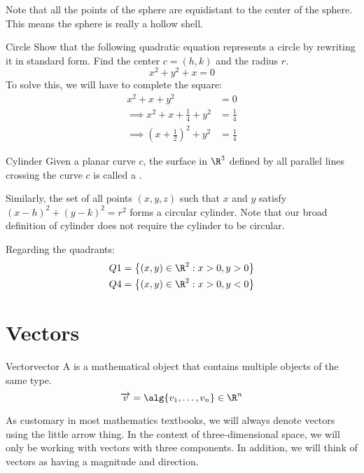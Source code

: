 \documentclass[12pt]{report}
\begin{document}
Note that all the points of the sphere are equidistant to the center of the sphere. This means the sphere is really a hollow shell.

\begin{exbox}{Circle}{}
    Show that the following quadratic equation represents a circle by rewriting it in standard form. Find the center $c = (h,k)$ and the radius $r$.
    \[ x^2 + y^2 + x = 0 \]
    \tcblower
    To solve this, we will have to complete the square:
    \begin{align*}
        x^2 + x + y^2 &= 0 \\
        \implies x^2 + x + \frac{1}{4} + y^2 &= \frac{1}{4} \\
        \implies \left( x + \frac12 \right)^2 + y^2 &= \frac14
    \end{align*}
\end{exbox}

\begin{dfnbox}{Cylinder}{}
    Given a planar curve $c$, the surface in $\R^3$ defined by all parallel lines crossing the curve $c$ is called a .
\end{dfnbox}

Similarly, the set of all points $(x,y,z)$ such that $x$ and $y$ satisfy $(x-h)^2 + (y-k)^2 = r^2$ forms a circular cylinder. Note that our broad definition of cylinder does not require the cylinder to be circular.

Regarding the quadrants:
\begin{align*}
    Q1 &= \left\{ (x,y) \in \R^2 : x > 0, y > 0 \right\} \\
    Q4 &= \left\{ (x,y) \in \R^2 : x > 0, y < 0 \right\}
\end{align*}


\section{Vectors}

\begin{dfnbox}{Vector}{vector}
    A  is a mathematical object that contains multiple objects of the same type.
    \tcblower
    \[ \overrightarrow{v} = \alg{v_1, \ldots, v_n} \in \R^n \]
\end{dfnbox}

As customary in most mathematics textbooks, we will always denote vectors using the little arrow thing. In the context of three-dimensional space, we will only be working with vectors with three components. In addition, we will think of vectors as having a magnitude and direction.
\end{document}

